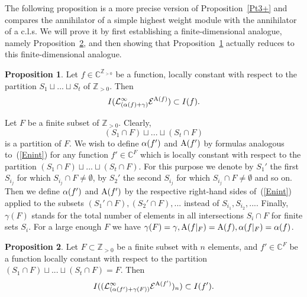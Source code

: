 \documentclass[10pt]{amsart}\oddsidemargin -1mm \evensidemargin -1mm \topmargin -15mm\headheight5mm \headsep 3.5mm \textheight 245mm\textwidth 170mm %
\theoremstyle{definition}\newtheorem{theorem}{Theorem}[section]\newtheorem{lemma}[theorem]{Lemma}\newtheorem{remark}[theorem]{Remark}\newtheorem{proposition}[theorem]{Proposition}\newtheorem{corollary}[theorem]{Corollary}\newtheorem{definition}[theorem]{Definition}\newtheorem{Ex}[theorem]{Example}
\begin{document}
The following proposition is a more precise version of Proposition~\ref{Pt3+} and compares the annihilator of a simple highest weight module with the annihilator of a c.l.s. We will prove it by first establishing a finite-dimensional analogue, namely Proposition~\ref{Pailf-f}, and then showing that Proposition~\ref{Pailf} actually reduces to this finite-dimensional analogue.%
\begin{proposition}\label{Pailf} Let $f\in\mathbb C^{\mathbb Z_{>0}}$ be a function, locally constant with respect to the partition $S_1\sqcup...\sqcup S_t$ of $\mathbb Z_{>0}$. Then $$I(\mathcal L_{(\operatorname{\alpha}(f)+\gamma)}^\infty \mathcal E^{\operatorname{A}(f)})\subset I(f).$$\end{proposition}
Let $F$ be a finite subset of $\mathbb Z_{>0}$. Clearly, $$(S_1\cap F)\sqcup...\sqcup(S_t\cap F)$$ is a partition of $F$.
We wish to define $\operatorname{\alpha}(f')$ and $\operatorname{A}(f')$ by formulas analogous to~(\ref{Enint}) for any function $f'\in\mathbb C^F$ which is locally constant with respect to the partition $(S_1\cap F)\sqcup...\sqcup (S_t\cap F)$.
For this purpose we denote by $S_1'$ the first $S_{i_j}$ for which $S_{i_j}\cap F\ne\emptyset$, by $S_2'$ the second $S_{i_j}$ for which $S_{i_j}\cap F\ne\emptyset$ and so on. Then we define $\operatorname{\alpha}(f')$ and $\operatorname{A}(f')$ by the respective right-hand sides of~(\ref{Enint}) applied to the subsets $(S_1'\cap F), (S_2'\cap F),...$ instead of $S_{i_1}, S_{i_2},...$. Finally, $\gamma(F)$ stands for the total number of elements in all intersections $S_i\cap F$ for finite sets $S_i$. For a large enough $F$ we have $\gamma(F)=\gamma, \operatorname{A}(f|_F)=\operatorname{A}(f), \operatorname{\alpha}(f|_F)=\operatorname{\alpha}(f)$.
\begin{proposition}\label{Pailf-f}Let $F\subset\mathbb Z_{>0}$ be a finite subset with $n$ elements, and $f'\in\mathbb C^F$ be a function locally constant with respect to the partition $(S_1\cap F)\sqcup...\sqcup (S_t\cap F)=F$. Then $$I((\mathcal L_{(\operatorname{\alpha}(f')+\gamma(F))}^\infty \mathcal E^{\operatorname{A}(f')})_n)\subset I(f').$$\end{proposition}
\end{document}
